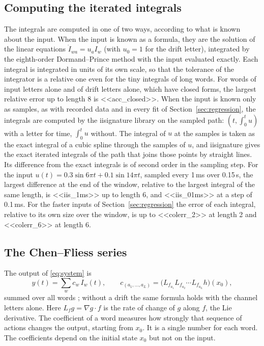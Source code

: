 \documentclass[11pt,a4paper]{article}
\theoremstyle{remark}
\begin{document}
\subsection{Computing the iterated integrals}\label{sec:computing}
The integrals are computed in one of two ways, according to what is known about the input.
When the input is known as a formula, they are the solution of the linear equations $\dot I_{wa}=u_aI_w$ (with $u_0=1$ for the drift letter), integrated by the eighth-order Dormand--Prince method \cite{HairerNorsettWanner1993} with the input evaluated exactly.
Each integral is integrated in units of its own scale, so that the tolerance of the integrator is a relative one even for the tiny integrals of long words.
For words of input letters alone and of drift letters alone, which have closed forms, the largest relative error up to length 8 is <<acc_closed>>.
When the input is known only as samples, as with recorded data and in every fit of Section~\ref{sec:regression}, the integrals are computed by the iisignature library \cite{ReizensteinGraham2020} on the sampled path: $(t,\int_0^tu)$ with a letter for time, $\int_0^tu$ without.
The integral of $u$ at the samples is taken as the exact integral of a cubic spline through the samples of $u$, and iisignature gives the exact iterated integrals of the path that joins those points by straight lines.
Its difference from the exact integrals is of second order in the sampling step.
For the input $u(t)=0.3\sin 6\pi t+0.1\sin 14\pi t$, sampled every 1\,ms over 0.15\,s, the largest difference at the end of the window, relative to the largest integral of the same length, is <<iis_1ms>> up to length 6, and <<iis_01ms>> at a step of 0.1\,ms.
For the faster inputs of Section~\ref{sec:regression} the error of each integral, relative to its own size over the window, is up to <<colerr_2>> at length 2 and <<colerr_6>> at length 6.

\subsection{The Chen--Fliess series}
The output of \eqref{eq:system} is
\begin{equation}\label{eq:cfs}
y(t)=\sum_{w} c_w\,I_w(t),\qquad c_{(a_1,\dots,a_L)}=\bigl(L_{f_{a_1}}L_{f_{a_2}}\cdots L_{f_{a_L}}h\bigr)(x_0),
\end{equation}
summed over all words \cite{Fliess1981,Isidori1995}; without a drift the same formula holds with the channel letters alone.
Here $L_fg=\nabla g\cdot f$ is the rate of change of $g$ along $f$, the Lie derivative.
The coefficient of a word measures how strongly that sequence of actions changes the output, starting from $x_0$.
It is a single number for each word.
The coefficients depend on the initial state $x_0$ but not on the input.
\end{document}
